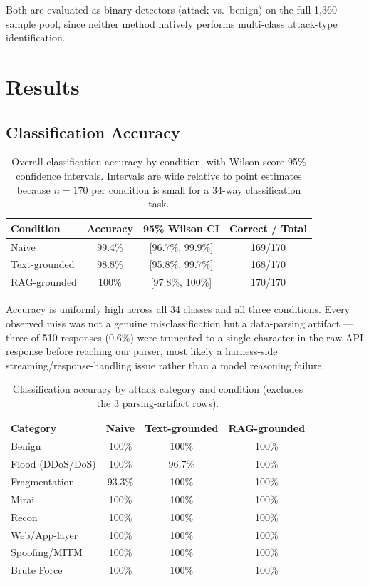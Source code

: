 \documentclass[10pt,twocolumn]{article}
\begin{document}
Both are evaluated as binary detectors (attack vs.\ benign) on the full 1{,}360-sample pool, since neither method natively performs multi-class attack-type identification.

\section{Results}

\subsection{Classification Accuracy}

\begin{table}[t]
\centering
\small
\begin{tabular}{lccc}
\toprule
Condition & Accuracy & 95\% Wilson CI & Correct / Total \\
\midrule
Naive & 99.4\% & [96.7\%, 99.9\%] & 169/170 \\
Text-grounded & 98.8\% & [95.8\%, 99.7\%] & 168/170 \\
RAG-grounded & 100\% & [97.8\%, 100\%] & 170/170 \\
\bottomrule
\end{tabular}
\caption{Overall classification accuracy by condition, with Wilson score 95\% confidence intervals. Intervals are wide relative to point estimates because $n{=}170$ per condition is small for a 34-way classification task.}
\end{table}

Accuracy is uniformly high across all 34 classes and all three conditions. Every observed miss was not a genuine misclassification but a data-parsing artifact --- three of 510 responses (0.6\%) were truncated to a single character in the raw API response before reaching our parser, most likely a harness-side streaming/response-handling issue rather than a model reasoning failure.

\begin{table}[t]
\centering
\small
\begin{tabular}{lccc}
\toprule
Category & Naive & Text-grounded & RAG-grounded \\
\midrule
Benign & 100\% & 100\% & 100\% \\
Flood (DDoS/DoS) & 100\% & 96.7\% & 100\% \\
Fragmentation & 93.3\% & 100\% & 100\% \\
Mirai & 100\% & 100\% & 100\% \\
Recon & 100\% & 100\% & 100\% \\
Web/App-layer & 100\% & 100\% & 100\% \\
Spoofing/MITM & 100\% & 100\% & 100\% \\
Brute Force & 100\% & 100\% & 100\% \\
\bottomrule
\end{tabular}
\caption{Classification accuracy by attack category and condition (excludes the 3 parsing-artifact rows).}
\end{table}
\end{document}
